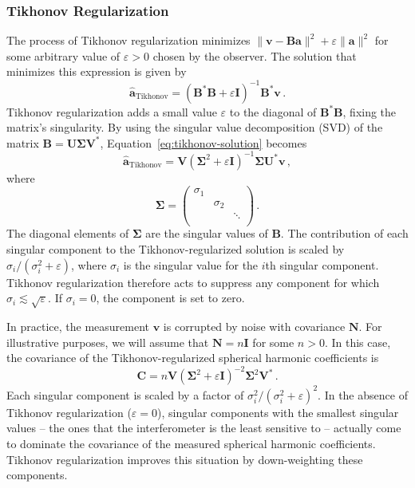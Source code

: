 \documentclass[twocolumn]{aastex61}
\renewcommand{\b}{\pmb}
\newcommand{\atikh}{\b{\hat a}_\text{Tikhonov}}
\begin{document}
\subsubsection{Tikhonov Regularization}

The process of Tikhonov regularization minimizes $\|\b v - \b B\b a\|^2 + \varepsilon\|\b a\|^2$ for
some arbitrary value of $\varepsilon > 0$ chosen by the observer. The solution that minimizes this
expression is given by
\begin{equation}\label{eq:tikhonov-solution}
    \atikh = (\b B^*\b B + \varepsilon\b I)^{-1}\b B^*\b v\,.
\end{equation}
Tikhonov regularization adds a small value $\varepsilon$ to the diagonal of $\b B^*\b B$, fixing the
matrix's singularity. By using the singular value decomposition (SVD) of the matrix $\b B = \b U \b
\Sigma \b V^*$, Equation~\ref{eq:tikhonov-solution} becomes
\begin{equation}
    \atikh = \b V (\b\Sigma^2 + \varepsilon \b I)^{-1}\b\Sigma \b U^*\b v\,,
\end{equation}
where
\[
    \b\Sigma = \left(
        \begin{array}{ccc}
            \sigma_1 & & \\
                     & \sigma_2 & \\
                     & & \ddots \\
        \end{array}
    \right)\,.
\]
The diagonal elements of $\b\Sigma$ are the singular values of $\b B$. The contribution of each
singular component to the Tikhonov-regularized solution is scaled by $\sigma_i / (\sigma_i^2 +
\varepsilon)$, where $\sigma_i$ is the singular value for the $i$th singular component. Tikhonov
regularization therefore acts to suppress any component for which
$\sigma_i\lesssim\sqrt{\varepsilon}$.  If $\sigma_i = 0$, the component is set to zero.

In practice, the measurement $\b v$ is corrupted by noise with covariance $\b N$. For illustrative
purposes, we will assume that $\b N=n\b I$ for some $n>0$. In this case, the covariance of the
Tikhonov-regularized spherical harmonic coefficients is
\begin{equation}
    \b C = n \b V (\b\Sigma^2 + \varepsilon\b I)^{-2} \b\Sigma^2 \b V^*\,.
\end{equation}
Each singular component is scaled by a factor of $\sigma_i^2/(\sigma_i^2 + \varepsilon)^2$.  In the
absence of Tikhonov regularization ($\varepsilon=0$), singular components with the smallest singular
values -- the ones that the interferometer is the least sensitive to -- actually come to dominate
the covariance of the measured spherical harmonic coefficients. Tikhonov regularization improves
this situation by down-weighting these components.
\end{document}
